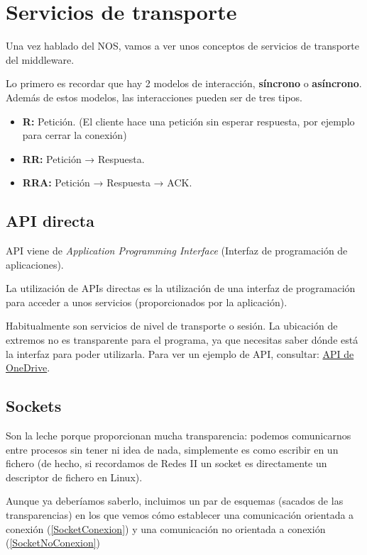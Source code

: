 \section{Servicios de transporte}

Una vez hablado del NOS, vamos a ver unos conceptos de  servicios de transporte del middleware.

Lo primero es recordar que hay 2 modelos de interacción, \textbf{síncrono} o \textbf{asíncrono}. Además de estos modelos, las interacciones pueden ser de tres tipos.
\begin{itemize}
	\item \textbf{R:} Petición. (El cliente hace una petición sin esperar respuesta, por ejemplo para cerrar la conexión)
	\item \textbf{RR:} Petición → Respuesta.
	\item \textbf{RRA:} Petición → Respuesta → ACK.
\end{itemize}

\subsection{API directa}

\begin{defn}
API viene de \textit{Application Programming Interface} (Interfaz de programación de aplicaciones).

La utilización de APIs directas es la utilización de una interfaz de programación para acceder a unos servicios (proporcionados por la aplicación).
\end{defn}

Habitualmente son servicios de nivel de transporte o sesión. La ubicación de extremos no es transparente para el programa, ya que necesitas saber dónde está la interfaz para poder utilizarla. Para ver un ejemplo de API, consultar: \href{https://apigee.com/OneDrive/embed/console/OneDrive}{API de OneDrive}.

\subsection{Sockets}

Son la leche porque proporcionan mucha transparencia: podemos comunicarnos entre procesos sin tener ni idea de nada, simplemente es como escribir en un fichero (de hecho, si recordamos de Redes II un socket es directamente un descriptor de fichero en Linux).

Aunque ya deberíamos saberlo, incluimos un par de esquemas (sacados de las transparencias) en los que vemos cómo establecer una comunicación orientada a conexión (\ref{SocketConexion}) y una comunicación no orientada a conexión (\ref{SocketNoConexion})


